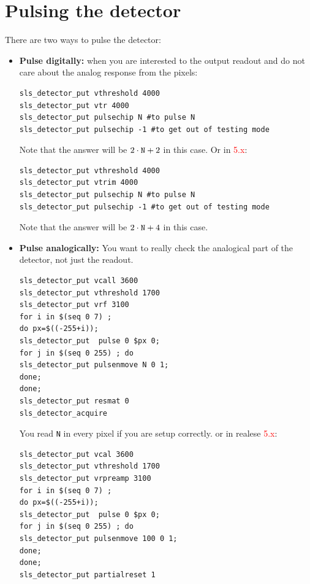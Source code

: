 \documentclass{article}
\begin{document}
{{{\section{Pulsing the detector}
There are two ways to pulse the detector: 
\begin{itemize}
\item \textbf{Pulse digitally:} when you are interested to the output readout and do not care about the analog response from the pixels:
\begin{verbatim}
sls_detector_put vthreshold 4000
sls_detector_put vtr 4000
sls_detector_put pulsechip N #to pulse N
sls_detector_put pulsechip -1 #to get out of testing mode 
\end{verbatim}
Note that the answer will be $2 \cdot \textrm{{\tt{N}}} +2$ in this case.
Or in \textcolor{red}{5.x}:
\begin{verbatim}
sls_detector_put vthreshold 4000
sls_detector_put vtrim 4000
sls_detector_put pulsechip N #to pulse N
sls_detector_put pulsechip -1 #to get out of testing mode
\end{verbatim}
Note that the answer will be $2 \cdot \textrm{{\tt{N}}} +4$ in this case.

\item  \textbf{Pulse analogically:} You want to really check the analogical part of the detector, not just the readout.

 \begin{verbatim}
sls_detector_put vcall 3600
sls_detector_put vthreshold 1700
sls_detector_put vrf 3100
for i in $(seq 0 7) ; 
do px=$((-255+i)); 
sls_detector_put  pulse 0 $px 0;
for j in $(seq 0 255) ; do
sls_detector_put pulsenmove N 0 1;
done;
done;
sls_detector_put resmat 0
sls_detector_acquire
\end{verbatim}
You read {\tt{N}} in every pixel if you are setup correctly. 
or in realese \textcolor{red}{5.x}:
\begin{verbatim}
sls_detector_put vcal 3600
sls_detector_put vthreshold 1700
sls_detector_put vrpreamp 3100
for i in $(seq 0 7) ;
do px=$((-255+i));
sls_detector_put  pulse 0 $px 0;
for j in $(seq 0 255) ; do
sls_detector_put pulsenmove 100 0 1;
done;
done;
sls_detector_put partialreset 1
\end{verbatim}
\end{itemize}
 



}}}
\end{document}
